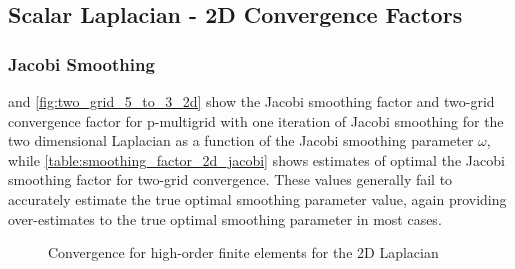 \documentclass[review]{siamart190516}
\begin{document}
\subsection{Scalar Laplacian - 2D Convergence Factors}\label{sec:2dresults}

\subsubsection{Jacobi Smoothing}

 and \cref{fig:two_grid_5_to_3_2d} show the Jacobi smoothing factor and two-grid convergence factor for p-multigrid with one iteration of Jacobi smoothing for the two dimensional Laplacian as a function of the Jacobi smoothing parameter $\omega$, while \cref{table:smoothing_factor_2d_jacobi} shows estimates of optimal the Jacobi smoothing factor for two-grid convergence.
These values generally fail to accurately estimate the true optimal smoothing parameter value, again providing over-estimates to the true optimal smoothing parameter in most cases.

\begin{figure}[!tbp]
  \centering
  \hfill
  \caption{Convergence for high-order finite elements for the 2D Laplacian}
\end{figure}
\end{document}
